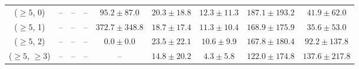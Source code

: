 \begin{table}[h!]
{\begin{tabular}{ccccccccc}
	($\ge5$, 0) & -- & -- & -- & $95.2\pm 87.0$ & $20.3\pm 18.8$ & $12.3\pm 11.3$ & $187.1\pm 193.2$ & $41.9\pm 62.0$ \\[0.5ex] 
	($\ge5$, 1) & -- & -- & -- & $372.7\pm 348.8$ & $18.7\pm 17.4$ & $11.3\pm 10.4$ & $168.9\pm 175.9$ & $35.6\pm 53.0$ \\[0.5ex] 
	($\ge5$, 2) & -- & -- & -- & $0.0\pm 0.0$ & $23.5\pm 22.1$ & $10.6\pm 9.9$ & $167.8\pm 180.4$ & $92.2\pm 137.8$ \\[0.5ex] 
	($\ge5$, $\ge3$) & -- & -- & -- & -- & $14.8\pm 20.2$ & $4.3\pm 5.8$ & $122.0\pm 174.8$ & $137.6\pm 217.8$ \\[0.5ex] 
	\hline
	\hline
\end{tabular}}
\end{table}
